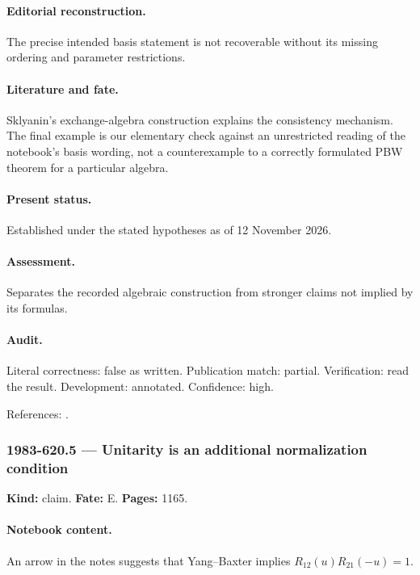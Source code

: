 \paragraph{Editorial reconstruction.} The precise intended basis statement is not recoverable without its missing ordering and parameter restrictions.

\paragraph{Literature and fate.} Sklyanin’s exchange-algebra construction explains the consistency mechanism. The final example is our elementary check against an unrestricted reading of the notebook’s basis wording, not a counterexample to a correctly formulated PBW theorem for a particular algebra.

\paragraph{Present status.} Established under the stated hypotheses as of 12 November 2026.

\paragraph{Assessment.} Separates the recorded algebraic construction from stronger claims not implied by its formulas.

\paragraph{Audit.} Literal correctness: false as written. Publication match: partial. Verification: read the result. Development: annotated. Confidence: high.

\noindent References: \citep{sklyanin1982algebraic}.\par

\subsubsection{1983-620.5 --- Unitarity is an additional normalization condition}

\label{item:1983-620.5}

\noindent\textbf{Kind:} claim. \textbf{Fate:} E. \textbf{Pages:} 1165.\par

\paragraph{Notebook content.} An arrow in the notes suggests that Yang–Baxter implies \(R_{12}(u)R_{21}(-u)=1\).

